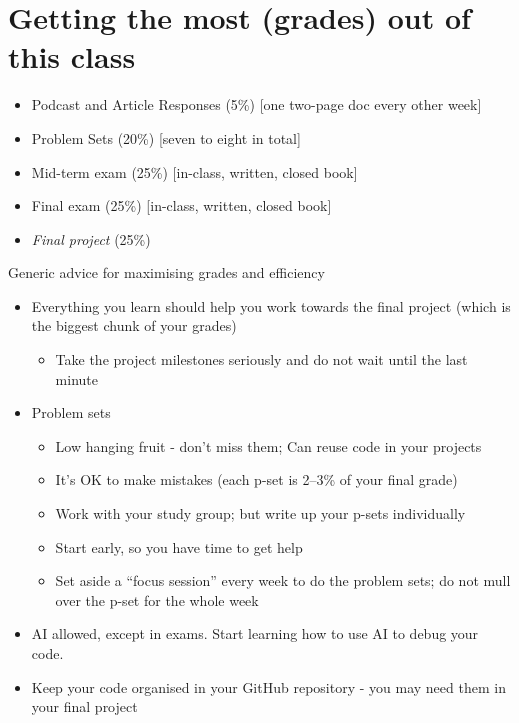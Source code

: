 \documentclass[
  11pt,
  letterpaper]{article}
\providecommand{\tightlist}{%
  \setlength{\itemsep}{0pt}\setlength{\parskip}{0pt}}
\begin{document}
\section{Getting the most (grades) out of this
class}\label{getting-the-most-grades-out-of-this-class}

\begin{itemize}
\tightlist
\item
  Podcast and Article Responses (5\%) {[}one two-page doc every other
  week{]}
\item
  Problem Sets (20\%) {[}seven to eight in total{]}
\item
  Mid-term exam (25\%) {[}in-class, written, closed book{]}
\item
  Final exam (25\%) {[}in-class, written, closed book{]}
\item
  \emph{Final project} (25\%)
\end{itemize}

\newpage

Generic advice for maximising grades and efficiency

\begin{itemize}
\tightlist
\item
  Everything you learn should help you work towards the final project
  (which is the biggest chunk of your grades)

  \begin{itemize}
  \tightlist
  \item
    Take the project milestones seriously and do not wait until the last
    minute
  \end{itemize}
\item
  Problem sets

  \begin{itemize}
  \tightlist
  \item
    Low hanging fruit - don't miss them; Can reuse code in your projects
  \item
    It's OK to make mistakes (each p-set is 2--3\% of your final grade)
  \item
    Work with your study group; but write up your p-sets individually
  \item
    Start early, so you have time to get help
  \item
    Set aside a ``focus session'' every week to do the problem sets; do
    not mull over the p-set for the whole week
  \end{itemize}
\item
  AI allowed, except in exams. Start learning how to use AI to debug
  your code.
\item
  Keep your code organised in your GitHub repository - you may need them
  in your final project
\end{itemize}
\end{document}
